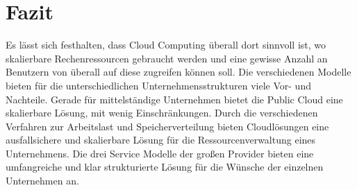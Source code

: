 \section{Fazit}
Es lässt sich festhalten, dass Cloud Computing überall dort sinnvoll ist, wo skalierbare Rechenressourcen gebraucht werden und eine gewisse Anzahl an Benutzern von überall auf diese zugreifen können soll.
Die verschiedenen Modelle bieten für die unterschiedlichen Unternehmensstrukturen viele Vor- und Nachteile. Gerade für mittelständige Unternehmen bietet die Public Cloud eine skalierbare Lösung, mit wenig Einschränkungen. Durch die verschiedenen Verfahren zur Arbeitslast und Speicherverteilung bieten Cloudlösungen eine ausfallsichere und skalierbare Lösung für die Ressourcenverwaltung eines Unternehmens. Die drei Service Modelle der großen Provider bieten eine umfangreiche und klar strukturierte Lösung für die Wünsche der einzelnen Unternehmen an.

